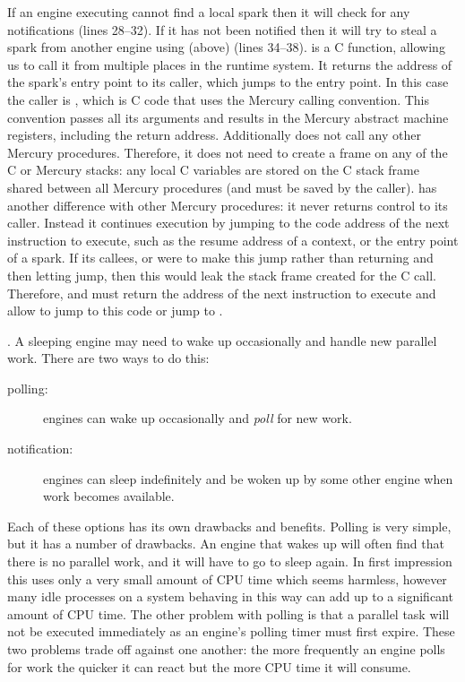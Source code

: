 If an engine executing \idle cannot find a local spark then it will
check for any notifications (lines 28--32).
If it has not been notified then it will try to steal a spark from another
engine using \trystealspark (above) (lines 34--38).
\trystealspark is a C function,
allowing us to call it from multiple places in the runtime system.
It returns the address of the spark's entry point to its caller,
which jumps to the entry point.
In this case the caller is \idle,
which is C code that uses the Mercury calling convention.
This convention passes all its arguments and results in the Mercury abstract
machine registers, including the return address.
Additionally \idle does not call any other Mercury procedures.
Therefore, it does not need to create a frame on any of the C or Mercury stacks:
any local C variables are stored on the C stack frame shared between all
Mercury procedures (and must be saved by the caller).
\idle has another difference with other Mercury procedures:
it never returns control to its caller.
Instead it continues execution by jumping to the code address of the next
instruction to execute,
such as the resume address of a context,
or the entry point of a spark.
If its callees, \trystealspark or \prepareengineforcontext were to make this
jump rather than returning and then letting \idle jump,
then this would leak the stack frame created for the C call.
Therefore, \trystealspark and \prepareengineforcontext must return the
address of the next instruction to execute and allow \idle to jump to this
code or jump to \sleep.

\pagebreak
{}.
A sleeping engine may need to wake up occasionally and handle new parallel
work.
There are two ways to do this:

\begin{description}

    \item[polling:] engines can wake up occasionally and \emph{poll} for new
    work.

    \item[notification:] engines can sleep indefinitely and be woken up by
    some other engine when work becomes available.

\end{description}

\noindent
Each of these options has its own drawbacks and benefits.
Polling is very simple, but it has a number of drawbacks.
An engine that wakes up will often find that there is no parallel work,
and it will have to go to sleep again.
In first impression this uses only a very small amount of CPU time which
seems harmless,
however many idle processes on a system behaving in this way can add up to a
significant amount of CPU time.
The other problem with polling is that a parallel task will not be executed
immediately as an engine's polling timer must first expire.
These two problems trade off against one another:
the more frequently an engine polls for work the quicker it can react but
the more CPU time it will consume.

